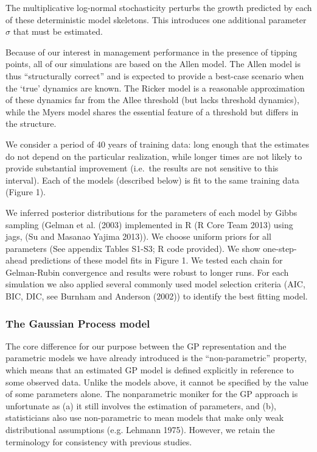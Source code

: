 \documentclass[author-year, 12pt,review]{elsarticle} %
\begin{document}
The multiplicative log-normal stochasticity perturbs the growth
predicted by each of these deterministic model skeletons. This
introduces one additional parameter $\sigma$ that must be estimated.

Because of our interest in management performance in the presence of
tipping points, all of our simulations are based on the Allen model. The
Allen model is thus ``structurally correct'' and is expected to provide
a best-case scenario when the `true' dynamics are known. The Ricker
model is a reasonable approximation of these dynamics far from the Allee
threshold (but lacks threshold dynamics), while the Myers model shares
the essential feature of a threshold but differs in the structure.

We consider a period of 40 years of training data: long enough that the
estimates do not depend on the particular realization, while longer
times are not likely to provide substantial improvement (i.e.~the
results are not sensitive to this interval). Each of the models
(described below) is fit to the same training data (Figure 1).

We inferred posterior distributions for the parameters of each model by
Gibbs sampling (Gelman et al. (2003) implemented in R (R Core Team 2013)
using jags, (Su and Masanao Yajima 2013)). We choose uniform priors for
all parameters (See appendix Tables S1-S3; R code provided). We show
one-step-ahead predictions of these model fits in Figure 1. We tested
each chain for Gelman-Rubin convergence and results were robust to
longer runs. For each simulation we also applied several commonly used
model selection criteria (AIC, BIC, DIC, see Burnham and Anderson
(2002)) to identify the best fitting model.

\subsubsection{The Gaussian Process
model}\label{the-gaussian-process-model}

The core difference for our purpose between the GP representation and
the parametric models we have already introduced is the
``non-parametric'' property, which means that an estimated GP model is
defined explicitly in reference to some observed data. Unlike the models
above, it cannot be specified by the value of some parameters alone. The
nonparametric moniker for the GP approach is unfortunate as (a) it still
involves the estimation of parameters, and (b), statisticians also use
non-parametric to mean models that make only weak distributional
assumptions (e.g. Lehmann 1975). However, we retain the terminology for
consistency with previous studies.
\end{document}

